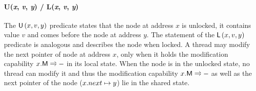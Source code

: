 \paragraph{\textbf{\textsf{U(}\textit{x}, \textit{v}, \textit{y}\textsf{)} / \textsf{L(}\textit{x}, \textit{v}, \textit{y}\textsf{)}}}
The $\textsf{U}\left(x, v, y\right)$ predicate states that the node at address $x$ is unlocked, it contains value $v$ and comes before the node at address $y$. The statement of the $\textsf{L}\left(x, v, y\right)$ predicate is analogous and describes the node when locked.
%
%
A thread may modify the next pointer of node at address $x$, only when it holds the modification capability $\modC{x}$ in its local state. When the node is in the unlocked state, no thread can modify it and thus the modification capability $\modC{x}$ as well as the next pointer of the node ($x.next \mapsto y$) lie in the shared state. 
